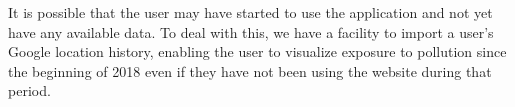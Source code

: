 It is possible that the user may have started to use the application and not yet have any available data.
To deal with this, we have a facility to import a user's Google location history, enabling the user to visualize
exposure to pollution since the beginning of 2018 even if they have not been using the website during that period.\\

